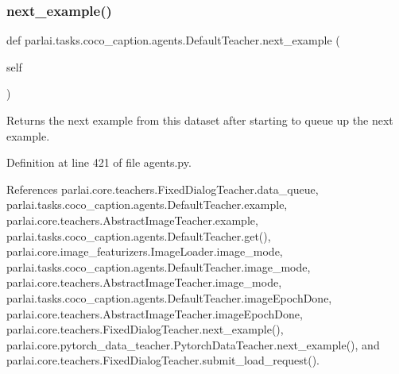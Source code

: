 \subsubsection{\texorpdfstring{next\+\_\+example()}{next\_example()}}
{\footnotesize\ttfamily def parlai.\+tasks.\+coco\+\_\+caption.\+agents.\+Default\+Teacher.\+next\+\_\+example (\begin{DoxyParamCaption}\item[{}]{self }\end{DoxyParamCaption})}

\begin{DoxyVerb}Returns the next example from this dataset after starting to queue
up the next example.
\end{DoxyVerb}
 

Definition at line 421 of file agents.\+py.



References parlai.\+core.\+teachers.\+Fixed\+Dialog\+Teacher.\+data\+\_\+queue, parlai.\+tasks.\+coco\+\_\+caption.\+agents.\+Default\+Teacher.\+example, parlai.\+core.\+teachers.\+Abstract\+Image\+Teacher.\+example, parlai.\+tasks.\+coco\+\_\+caption.\+agents.\+Default\+Teacher.\+get(), parlai.\+core.\+image\+\_\+featurizers.\+Image\+Loader.\+image\+\_\+mode, parlai.\+tasks.\+coco\+\_\+caption.\+agents.\+Default\+Teacher.\+image\+\_\+mode, parlai.\+core.\+teachers.\+Abstract\+Image\+Teacher.\+image\+\_\+mode, parlai.\+tasks.\+coco\+\_\+caption.\+agents.\+Default\+Teacher.\+image\+Epoch\+Done, parlai.\+core.\+teachers.\+Abstract\+Image\+Teacher.\+image\+Epoch\+Done, parlai.\+core.\+teachers.\+Fixed\+Dialog\+Teacher.\+next\+\_\+example(), parlai.\+core.\+pytorch\+\_\+data\+\_\+teacher.\+Pytorch\+Data\+Teacher.\+next\+\_\+example(), and parlai.\+core.\+teachers.\+Fixed\+Dialog\+Teacher.\+submit\+\_\+load\+\_\+request().


